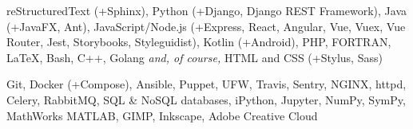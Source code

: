 
\sectiondescription
{
reStructuredText (+Sphinx),
Python (+Django, Django REST Framework),
Java (+JavaFX, Ant),
JavaScript/Node.js (+Express, React, Angular, Vue, Vuex, Vue Router, Jest, Storybooks, Styleguidist),
Kotlin (+Android),
PHP, FORTRAN, {\selectfont \LaTeX}, Bash, C++, Golang
\textit{and, of course,} HTML and CSS (+Stylus, Sass)
}

\sectiondescription
{
Git,
Docker (+Compose),
Ansible, Puppet, UFW,
Travis, Sentry,
NGINX, httpd, Celery, RabbitMQ, SQL \& NoSQL databases,
iPython, Jupyter, NumPy, SymPy, MathWorks MATLAB,
GIMP, Inkscape, Adobe Creative Cloud
}
